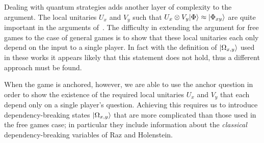 
Dealing with quantum strategies adds another layer of complexity to the argument. The local unitaries $U_x$ and $V_y$ such that $U_x \otimes V_y {|\Phi\rangle} \approx {|\Phi_{xy}\rangle}$ are quite important in the arguments of~\cite{jain2014parallel,chailloux2014parallel,chung2015parallel}. The difficulty in extending the argument for free games to the case of general games is to show that these local unitaries each only depend on the input to a single player. In fact with the definition of ${|\Omega_{x,y}\rangle}$ used in these works it appears likely that this statement does not hold, thus a different approach must be found. 

When the game is anchored, however, we are able to use the anchor question in order to show the existence of the required local unitaries $U_x$ and $V_y$ that each depend only on a single player's question. Achieving this requires us to introduce dependency-breaking states ${|\Omega_{x,y}\rangle}$ that are more complicated than those used in the free games case; in particular they include information about the \emph{classical} dependency-breaking variables of Raz and Holenstein. 

